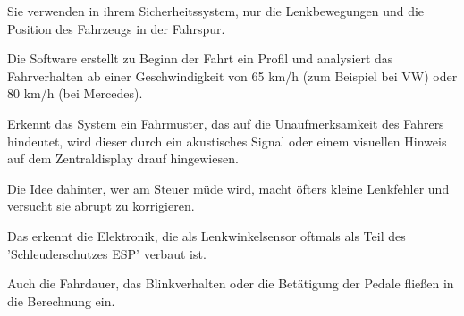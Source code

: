 Sie verwenden in ihrem Sicherheitssystem, nur die Lenkbewegungen und die Position des Fahrzeugs in der Fahrspur. 

Die Software erstellt zu Beginn der Fahrt ein Profil und analysiert das Fahrverhalten ab einer Geschwindigkeit von 65 km/h (zum Beispiel bei VW) oder 80 km/h (bei Mercedes).

Erkennt das System ein Fahrmuster, das auf die Unaufmerksamkeit des Fahrers hindeutet, wird dieser durch ein akustisches Signal oder einem visuellen Hinweis auf dem Zentraldisplay drauf hingewiesen.

Die Idee dahinter, wer am Steuer müde wird, macht öfters kleine Lenkfehler und versucht sie abrupt zu korrigieren. 

Das erkennt die Elektronik, die als Lenkwinkelsensor oftmals als Teil des 'Schleuderschutzes ESP' verbaut ist. 

Auch die Fahrdauer, das Blinkverhalten oder die Betätigung der Pedale fließen in die Berechnung ein.\cite{b4}
\newline
\newline




 